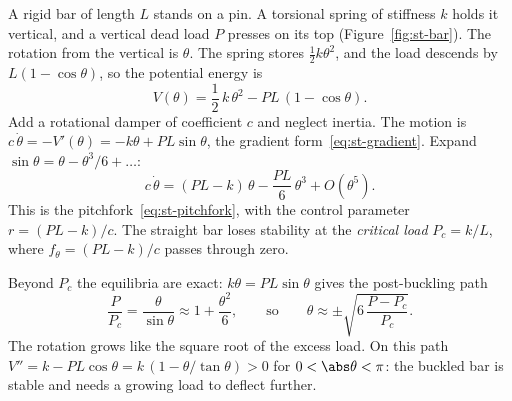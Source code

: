 \begin{example}\label{ex:st-bar}
%
A rigid bar of length $L$ stands on a pin. A torsional spring of stiffness $k$
holds it vertical, and a vertical dead load $P$ presses on its top
(Figure~\ref{fig:st-bar}). The rotation from the vertical is $\theta$. The spring
stores $\tfrac12 k\theta^2$, and the load descends by $L(1 - \cos\theta)$, so the
potential energy is
\begin{equation}\label{eq:st-bar-energy}
  V(\theta) = \frac12\,k\,\theta^2 - P L\,(1 - \cos\theta) .
\end{equation}
Add a rotational damper of coefficient $c$ and neglect inertia. The motion is
$c\,\dot\theta = -V'(\theta) = -k\theta + PL\sin\theta$, the gradient
form~\eqref{eq:st-gradient}. Expand $\sin\theta = \theta - \theta^3/6 + \dots$:
\begin{equation}\label{eq:st-bar-pitchfork}
  c\,\dot\theta = (PL - k)\,\theta - \frac{PL}{6}\,\theta^3 + O(\theta^5).
\end{equation}
This is the pitchfork~\eqref{eq:st-pitchfork}, with the control parameter
$r = (PL - k)/c$. The straight bar loses stability at the \emph{critical load}
$P_c = k/L$, where $f_\theta = (PL - k)/c$ passes through zero.
%

Beyond $P_c$ the equilibria are exact: $k\theta = PL\sin\theta$ gives the
post-buckling path
\begin{equation}\label{eq:st-bar-path}
  \frac{P}{P_c} = \frac{\theta}{\sin\theta} \approx 1 + \frac{\theta^2}{6},
  \qquad\text{so}\qquad
  \theta \approx \pm\sqrt{6\,\frac{P - P_c}{P_c}} .
\end{equation}
The rotation grows like the square root of the excess load. On this path
$V'' = k - PL\cos\theta = k\,(1 - \theta/\tan\theta) > 0$ for
$0 < \abs\theta < \pi$: the buckled bar is stable and needs a growing load to
deflect further.
\end{example}

